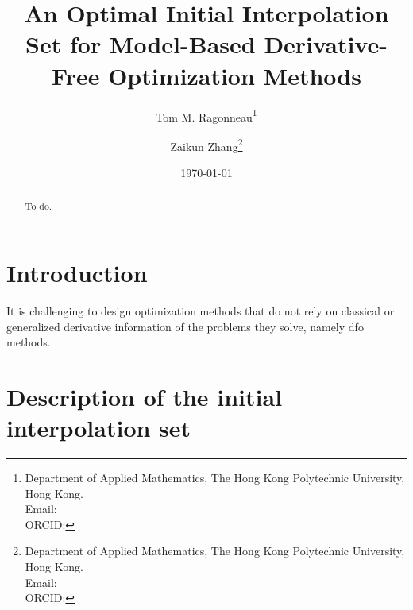\documentclass[draft]{article}
\title{An Optimal Initial Interpolation Set for Model-Based Derivative-Free Optimization Methods}
\author{
    Tom M. Ragonneau\thanks{
        Department of Applied Mathematics, The Hong Kong Polytechnic University, Hong Kong.\\
        Email: \email{tom.ragonneau@polyu.edu.hk}\\
        ORCID: \orcid{0000-0003-2717-2876}
    } \and
    Zaikun Zhang\thanks{
        Department of Applied Mathematics, The Hong Kong Polytechnic University, Hong Kong.\\
        Email: \email{zaikun.zhang@polyu.edu.hk}\\
        ORCID: \orcid{0000-0001-8934-8190}
    }
}
\date{\today}
\begin{document}
\maketitle

\begin{abstract}
    To do.
\end{abstract}

\section{Introduction}

It is challenging to design optimization methods that do not rely on classical or generalized derivative information of the problems they solve, namely \gls{dfo} methods.

\section{Description of the initial interpolation set}





\listoftodos
\end{document}
